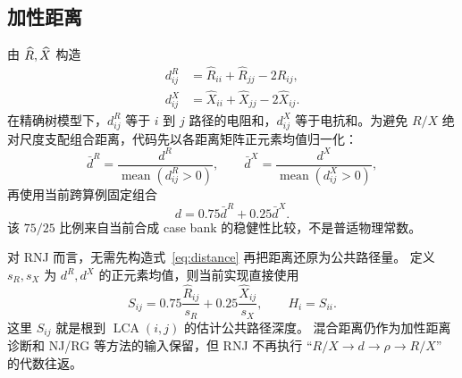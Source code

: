 \subsection{加性距离}

由 $\widehat{R},\widehat{X}$ 构造
\begin{align}
  d^R_{ij}&=\widehat R_{ii}+\widehat R_{jj}-2\widehat R_{ij},\\
  d^X_{ij}&=\widehat X_{ii}+\widehat X_{jj}-2\widehat X_{ij}.
  \label{eq:distance}
\end{align}
在精确树模型下，$d^R_{ij}$ 等于 $i$ 到 $j$ 路径的电阻和，$d^X_{ij}$
等于电抗和。为避免 $R/X$ 绝对尺度支配组合距离，代码先以各距离矩阵正元素均值归一化：
\[
\bar d^R=\frac{d^R}{\operatorname{mean}(d^R_{ij}>0)},\qquad
\bar d^X=\frac{d^X}{\operatorname{mean}(d^X_{ij}>0)},
\]
再使用当前跨算例固定组合
\begin{equation}
  d=0.75\bar d^R+0.25\bar d^X.
  \label{eq:mixed-distance}
\end{equation}
该 $75/25$ 比例来自当前合成 case bank 的稳健性比较，不是普适物理常数。

对 RNJ 而言，无需先构造式~\eqref{eq:distance} 再把距离还原为公共路径量。
定义 $s_R,s_X$ 为 $d^R,d^X$ 的正元素均值，则当前实现直接使用
\begin{equation}
  S_{ij}=0.75\frac{\widehat R_{ij}}{s_R}
  +0.25\frac{\widehat X_{ij}}{s_X},
  \qquad H_i=S_{ii}.
  \label{eq:direct-shared-score}
\end{equation}
这里 $S_{ij}$ 就是根到 $\operatorname{LCA}(i,j)$ 的估计公共路径深度。
混合距离仍作为加性距离诊断和 NJ/RG 等方法的输入保留，但 RNJ 不再执行
``$R/X\to d\to\rho\to R/X$'' 的代数往返。
